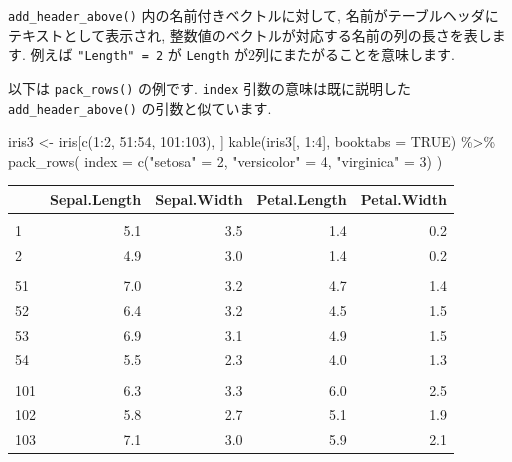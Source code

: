 \documentclass[
  11pt,
]{bxjsreport}
\newenvironment{Shaded}{\begin{snugshade}}{\end{snugshade}}
\newcommand{\AttributeTok}[1]{\textcolor[rgb]{0.77,0.63,0.00}{#1}}
\newcommand{\ConstantTok}[1]{\textcolor[rgb]{0.00,0.00,0.00}{#1}}
\newcommand{\DecValTok}[1]{\textcolor[rgb]{0.00,0.00,0.81}{#1}}
\newcommand{\FunctionTok}[1]{\textcolor[rgb]{0.00,0.00,0.00}{#1}}
\newcommand{\NormalTok}[1]{#1}
\newcommand{\OtherTok}[1]{\textcolor[rgb]{0.56,0.35,0.01}{#1}}
\newcommand{\SpecialCharTok}[1]{\textcolor[rgb]{0.00,0.00,0.00}{#1}}
\newcommand{\StringTok}[1]{\textcolor[rgb]{0.31,0.60,0.02}{#1}}
\begin{document}
\texttt{add\_header\_above()} 内の名前付きベクトルに対して, 名前がテーブルヘッダにテキストとして表示され, 整数値のベクトルが対応する名前の列の長さを表します. 例えば \texttt{"Length" = 2} が \texttt{Length} が2列にまたがることを意味します.

以下は \texttt{pack\_rows()} の例です. \texttt{index} 引数の意味は既に説明した \texttt{add\_header\_above()} の引数と似ています.

\begin{Shaded}
\begin{Highlighting}[numbers=left,,]
\NormalTok{iris3 }\OtherTok{\textless{}{-}}\NormalTok{ iris[}\FunctionTok{c}\NormalTok{(}\DecValTok{1}\SpecialCharTok{:}\DecValTok{2}\NormalTok{, }\DecValTok{51}\SpecialCharTok{:}\DecValTok{54}\NormalTok{, }\DecValTok{101}\SpecialCharTok{:}\DecValTok{103}\NormalTok{), ]}
\FunctionTok{kable}\NormalTok{(iris3[, }\DecValTok{1}\SpecialCharTok{:}\DecValTok{4}\NormalTok{], }\AttributeTok{booktabs =} \ConstantTok{TRUE}\NormalTok{) }\SpecialCharTok{\%\textgreater{}\%} \FunctionTok{pack\_rows}\NormalTok{(}
  \AttributeTok{index =} \FunctionTok{c}\NormalTok{(}\StringTok{"setosa"} \OtherTok{=} \DecValTok{2}\NormalTok{, }\StringTok{"versicolor"} \OtherTok{=} \DecValTok{4}\NormalTok{, }\StringTok{"virginica"} \OtherTok{=} \DecValTok{3}\NormalTok{)}
\NormalTok{)}
\end{Highlighting}
\end{Shaded}

\begin{tabular}{lrrrr}
\toprule
  & Sepal.Length & Sepal.Width & Petal.Length & Petal.Width\\
\midrule
\addlinespace[0.3em]
\multicolumn{5}{l}{\textbf{setosa}}\\
\hspace{1em}1 & 5.1 & 3.5 & 1.4 & 0.2\\
\hspace{1em}2 & 4.9 & 3.0 & 1.4 & 0.2\\
\addlinespace[0.3em]
\multicolumn{5}{l}{\textbf{versicolor}}\\
\hspace{1em}51 & 7.0 & 3.2 & 4.7 & 1.4\\
\hspace{1em}52 & 6.4 & 3.2 & 4.5 & 1.5\\
\hspace{1em}53 & 6.9 & 3.1 & 4.9 & 1.5\\
\hspace{1em}54 & 5.5 & 2.3 & 4.0 & 1.3\\
\addlinespace[0.3em]
\multicolumn{5}{l}{\textbf{virginica}}\\
\hspace{1em}101 & 6.3 & 3.3 & 6.0 & 2.5\\
\hspace{1em}102 & 5.8 & 2.7 & 5.1 & 1.9\\
\hspace{1em}103 & 7.1 & 3.0 & 5.9 & 2.1\\
\bottomrule
\end{tabular}
\end{document}
